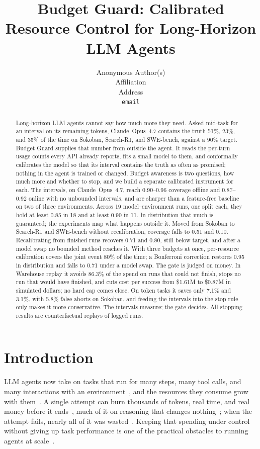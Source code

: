 \documentclass{article}
\title{Budget Guard: Calibrated Resource Control for Long-Horizon LLM Agents}
\author{
  Anonymous Author(s)\\
  Affiliation\\
  Address\\
  \texttt{email}
}
\begin{document}
\maketitle

\begin{abstract}
Long-horizon LLM agents cannot say how much more they need. Asked mid-task for an interval on its remaining tokens, Claude~Opus~4.7 contains the truth 51\%, 23\%, and 35\% of the time on Sokoban, Search-R1, and SWE-bench, against a 90\% target. Budget Guard supplies that number from outside the agent. It reads the per-turn usage counts every API already reports, fits a small model to them, and conformally calibrates the model so that its interval contains the truth as often as promised; nothing in the agent is trained or changed. Budget awareness is two questions, how much more and whether to stop, and we build a separate calibrated instrument for each. The intervals, on Claude~Opus~4.7, reach 0.90--0.96 coverage offline and 0.87--0.92 online with no unbounded intervals, and are sharper than a feature-free baseline on two of three environments. Across 19 model--environment runs, one split each, they hold at least 0.85 in 18 and at least 0.90 in 11. In distribution that much is guaranteed; the experiments map what happens outside it. Moved from Sokoban to Search-R1 and SWE-bench without recalibration, coverage falls to 0.51 and 0.10. Recalibrating from finished runs recovers 0.71 and 0.80, still below target, and after a model swap no bounded method reaches it. With three budgets at once, per-resource calibration covers the joint event 80\% of the time; a Bonferroni correction restores 0.95 in distribution and falls to 0.71 under a model swap. The gate is judged on money. In Warehouse replay it avoids 86.3\% of the spend on runs that could not finish, stops no run that would have finished, and cuts cost per success from \$1.61M to \$0.87M in simulated dollars; no hard cap comes close. On token tasks it saves only 7.1\% and 3.1\%, with 5.8\% false aborts on Sokoban, and feeding the intervals into the stop rule only makes it more conservative. The intervals measure; the gate decides. All stopping results are counterfactual replays of logged runs.
\end{abstract}

\raggedbottom
\section{Introduction}
\label{sec:intro}

LLM agents now take on tasks that run for many steps, many tool calls, and many interactions with an environment~\cite{kwa2025measuring}, and the resources they consume grow with them~\cite{chen2026token}. A single attempt can burn thousands of tokens, real time, and real money before it ends~\cite{bai2026how}, much of it on reasoning that changes nothing~\cite{sui2025stop,wang2025harnessing,yue2025dont}; when the attempt fails, nearly all of it was wasted~\cite{bai2026how}. Keeping that spending under control without giving up task performance is one of the practical obstacles to running agents at scale~\cite{chen2024frugalgpt,zellinger2025cost,davidov2026knowing}.
\end{document}
